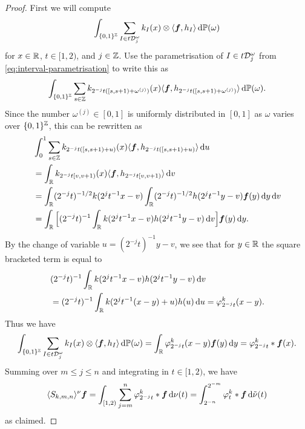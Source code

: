{\begin{proof}
  First we will compute
  \begin{equation*}
    \int_{\{0,1\}^{\mathbb{Z}}} \sum_{I \in t\mathcal{D}_{j}^{\omega}} k_{I}(x) \otimes \langle \bm{f}, h_{I} \rangle \, \mathrm{d}\mathbb{P}(\omega)
  \end{equation*}
  for $x \in \mathbb{R}$, $t \in [1,2)$, and $j \in \mathbb{Z}$.
  Use the parametrisation of $I \in t\mathcal{D}_{j}^{\omega}$ from \eqref{eq:interval-parametrisation} to write this as
  \begin{equation*}
    \int_{\{0,1\}^{\mathbb{Z}}} \sum_{s \in \mathbb{Z}} k_{2^{-j}t([s,s+1) + \omega^{(j)})}(x) \langle \bm{f}, h_{2^{-j}t([s,s+1) + \omega^{(j)})} \rangle \, \mathrm{d}\mathbb{P}(\omega).
  \end{equation*}
  Since the number $\omega^{(j)} \in [0,1]$ is uniformly distributed in $[0,1]$ as $\omega$ varies over $\{0,1\}^{\mathbb{Z}}$, this can be rewritten as
  \begin{equation*}
    \begin{aligned}
    &\int_{0}^{1} \sum_{s \in \mathbb{Z}} k_{2^{-j}t([s,s+1) + u)}(x) \langle \bm{f}, h_{2^{-j}t([s,s+1) + u)} \rangle \, \mathrm{d} u \\
    &= \int_{\mathbb{R}}  k_{2^{-j}t[v,v+1)}(x) \langle \bm{f}, h_{2^{-j}t[v,v+1)} \rangle \, \mathrm{d} v \\
    &= \int_{\mathbb{R}} (2^{-j} t)^{-1/2} k(2^{j} t^{-1} x - v)\int_{\mathbb{R}} (2^{-j} t)^{-1/2} h(2^{j} t^{-1} y - v)\bm{f}(y) \, \mathrm{d} y \, \mathrm{d} v \\
    &= \int_{\mathbb{R}} \Big[ (2^{-j} t)^{-1} \int_{\mathbb{R}} k(2^j t^{-1} x - v) h(2^j t^{-1} y - v) \, \mathrm{d} v \Big] \bm{f}(y) \, \mathrm{d} y .
  \end{aligned}
\end{equation*}
By the change of variable $u = (2^{-j}t)^{-1} y - v$, we see that for $y \in \mathbb{R}$ the square bracketed term is equal to
\begin{equation*}
  \begin{aligned}
    &(2^{-j} t)^{-1} \int_{\mathbb{R}} k(2^j t^{-1} x - v) h(2^j t^{-1} y - v) \, \mathrm{d} v \\
    &= (2^{-j} t)^{-1} \int_{\mathbb{R}} k(2^j t^{-1} (x-y) + u) h(u) \, \mathrm{d} u
    = \varphi_{2^{-j} t}^{k}(x-y).
  \end{aligned}
\end{equation*}
Thus we have
\begin{equation*}
  \int_{\{0,1\}^{\mathbb{Z}}} \sum_{I \in t\mathcal{D}_{j}^{\omega}} k_{I}(x) \otimes \langle \bm{f}, h_{I} \rangle \, \mathrm{d}\mathbb{P}(\omega)
  = \int_{\mathbb{R}} \varphi_{2^{-j} t}^{k}(x-y) \bm{f}(y) \, \mathrm{d} y
  = \varphi_{2^{-j} t}^{k} \ast \bm{f}(x).
\end{equation*}
Summing over $m \leq j \leq n$ and integrating in $t \in [1,2)$, we have
\begin{equation*}
  \langle S_{k,m,n} \rangle^{\nu} \bm{f} = \int_{[1,2)} \sum_{j=m}^{n} \varphi_{2^{-j} t}^{k} \ast \bm{f}   \, \mathrm{d}\nu(t) = \int_{2^{-n}}^{2^{-m}} \varphi^{k}_{t} \ast \bm{f} \, \mathrm{d}\tilde{\nu}(t)
\end{equation*}
as claimed.
\end{proof}

}
